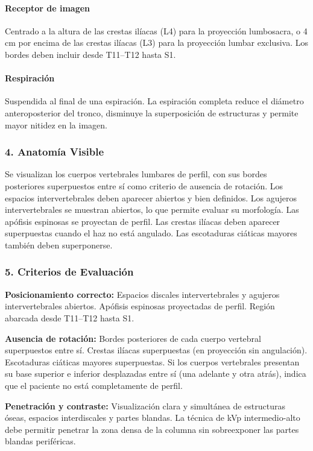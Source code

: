 		\paragraph{Receptor de imagen}
		Centrado a la altura de las crestas ilíacas (L4) para la proyección lumbosacra, o 4 cm por encima de las crestas ilíacas (L3) para la proyección lumbar exclusiva. Los bordes deben incluir desde T11--T12 hasta S1.
		
		\paragraph{Respiración}
		Suspendida al final de una espiración. La espiración completa reduce el diámetro anteroposterior del tronco, disminuye la superposición de estructuras y permite mayor nitidez en la imagen.
		
		\subsubsection*{4. Anatomía Visible}
		
		Se visualizan los cuerpos vertebrales lumbares de perfil, con sus bordes posteriores superpuestos entre sí como criterio de ausencia de rotación. Los espacios intervertebrales deben aparecer abiertos y bien definidos. Los agujeros intervertebrales se muestran abiertos, lo que permite evaluar su morfología. Las apófisis espinosas se proyectan de perfil. Las crestas ilíacas deben aparecer superpuestas cuando el haz no está angulado. Las escotaduras ciáticas mayores también deben superponerse.
		
		\subsubsection*{5. Criterios de Evaluación}
		
		\textbf{Posicionamiento correcto:} Espacios discales intervertebrales y agujeros intervertebrales abiertos. Apófisis espinosas proyectadas de perfil. Región abarcada desde T11--T12 hasta S1.
		
		\textbf{Ausencia de rotación:} Bordes posteriores de cada cuerpo vertebral superpuestos entre sí. Crestas ilíacas superpuestas (en proyección sin angulación). Escotaduras ciáticas mayores superpuestas. Si los cuerpos vertebrales presentan su base superior e inferior desplazadas entre sí (una adelante y otra atrás), indica que el paciente no está completamente de perfil.
		
		\textbf{Penetración y contraste:} Visualización clara y simultánea de estructuras óseas, espacios interdiscales y partes blandas. La técnica de kVp intermedio-alto debe permitir penetrar la zona densa de la columna sin sobreexponer las partes blandas periféricas.
		

